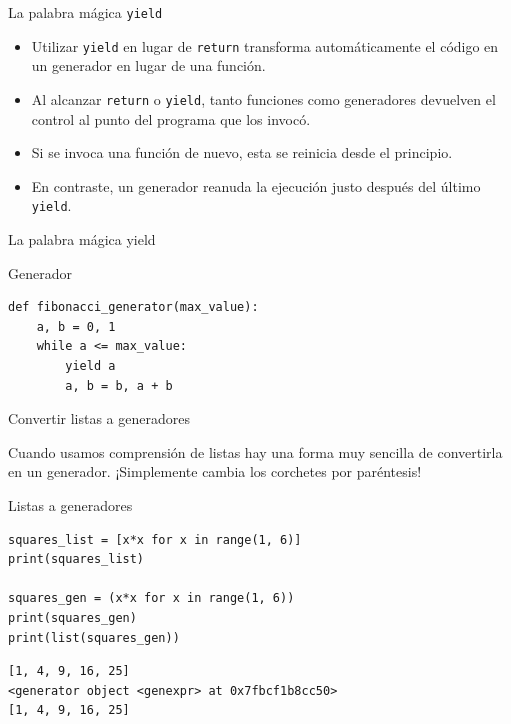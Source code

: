 \documentclass[11pt]{beamer}
\begin{document}
\begin{frame}{La palabra mágica \texttt{yield}}
    \begin{itemize}
        \item Utilizar \texttt{yield} en lugar de \texttt{return} transforma automáticamente el código en un generador en lugar de una función.
        \item Al alcanzar \texttt{return} o \texttt{yield}, tanto funciones como generadores devuelven el control al punto del programa que los invocó.
        \item Si se invoca una función de nuevo, esta se reinicia desde el principio.
        \item En contraste, un generador reanuda la ejecución justo después del último \texttt{yield}.
    \end{itemize}
\end{frame}

\begin{frame}[fragile]{La palabra mágica yield}
\begin{block}{Generador}
\begin{verbatim}
def fibonacci_generator(max_value):
    a, b = 0, 1
    while a <= max_value:
        yield a
        a, b = b, a + b
\end{verbatim}
\end{block} 
\end{frame}

\begin{frame}[fragile]{Convertir listas a generadores}

\begin{center}
   Cuando usamos comprensión de listas hay una forma muy sencilla de convertirla en un generador. ¡Simplemente cambia los corchetes por paréntesis! 
\end{center}

\begin{block}{Listas a generadores}
\begin{verbatim}
squares_list = [x*x for x in range(1, 6)]
print(squares_list)

squares_gen = (x*x for x in range(1, 6))
print(squares_gen)
print(list(squares_gen))
\end{verbatim}

\begin{verbatim}
[1, 4, 9, 16, 25]
<generator object <genexpr> at 0x7fbcf1b8cc50>
[1, 4, 9, 16, 25]   
\end{verbatim}
\end{block} 
\end{frame}
\end{document}
